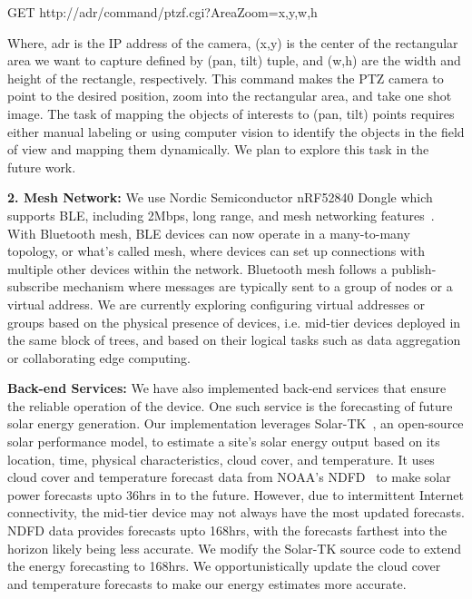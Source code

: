 {GET http://adr/command/ptzf.cgi?AreaZoom=x,y,w,h}

Where, adr is the IP address of the camera, (x,y) is the center of the rectangular area we want to capture defined by (pan, tilt) tuple, and (w,h) are the width and height of the rectangle, respectively. This command makes the PTZ camera to point to the desired position, zoom into the rectangular area, and take one shot image. 
The task of mapping the objects of interests to (pan, tilt) points requires either manual labeling or using computer vision to identify the objects in the field of view and mapping them dynamically. We plan to explore this task in the future work. 

\noindent
\textbf{2. Mesh Network:} We use Nordic Semiconductor nRF52840 Dongle which supports BLE, including 2Mbps, long range, and mesh networking features~\cite{nrf52840}. 
With Bluetooth mesh, BLE devices can now operate in a many-to-many topology, or what's called mesh, where devices can set up connections with multiple other devices within the network. Bluetooth mesh follows a publish-subscribe mechanism where messages are typically sent to a group of nodes or a virtual address. We are currently exploring configuring virtual addresses or groups based on the physical presence of devices, i.e. mid-tier devices deployed in the same block of trees, and based on their logical tasks such as data aggregation or collaborating edge computing.

\noindent
\textbf{Back-end Services: }
We have also implemented back-end services that ensure the reliable operation of the device. One such service is the forecasting of future solar energy generation. Our implementation leverages Solar-TK~\cite{bashir2019solar}, an open-source solar performance model, to estimate a site’s solar energy output based on its location, time, physical characteristics, cloud cover, and temperature. It uses cloud cover and temperature forecast data from NOAA's NDFD~\cite{ndfd} to make solar power forecasts upto 36hrs in to the future. However, due to intermittent Internet connectivity, the mid-tier device may not always have the most updated forecasts. NDFD data provides forecasts upto 168hrs, with the forecasts farthest into the horizon likely being less accurate. We modify the Solar-TK source code to extend the energy forecasting to 168hrs. We opportunistically update the cloud cover and temperature forecasts to make our energy estimates more accurate. 

